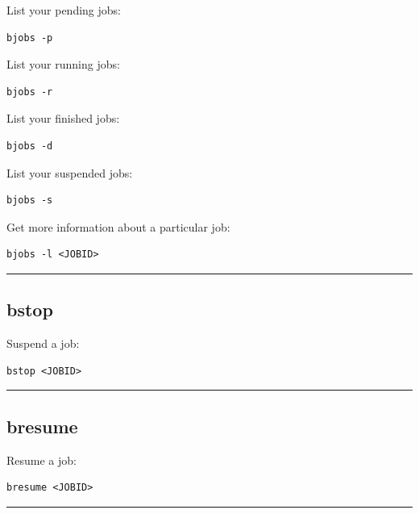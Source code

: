 \documentclass[11pt]{article}
\begin{document}
List your pending jobs:

\begin{verbatim}
bjobs -p
\end{verbatim}

List your running jobs:

\begin{verbatim}
bjobs -r
\end{verbatim}

List your finished jobs:

\begin{verbatim}
bjobs -d
\end{verbatim}

List your suspended jobs:

\begin{verbatim}
bjobs -s
\end{verbatim}

Get more information about a particular job:

\begin{verbatim}
bjobs -l <JOBID>
\end{verbatim}

    \begin{center}\rule{0.5\linewidth}{\linethickness}\end{center}

    \subsection{bstop}\label{bstop}

Suspend a job:

\begin{verbatim}
bstop <JOBID>
\end{verbatim}

    \begin{center}\rule{0.5\linewidth}{\linethickness}\end{center}

    \subsection{bresume}\label{bresume}

Resume a job:

\begin{verbatim}
bresume <JOBID>
\end{verbatim}

    \begin{center}\rule{0.5\linewidth}{\linethickness}\end{center}
\end{document}
